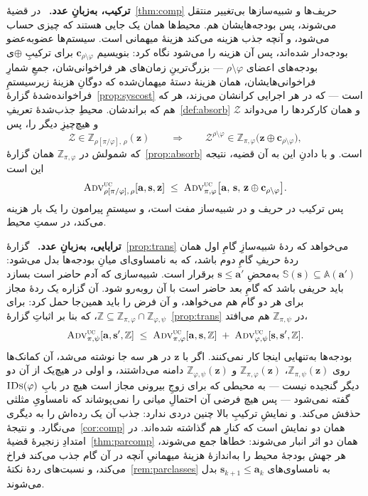 \documentclass[10pt,oneside,openany]{book}
\newcommand{\Zenv}{\mathcal{Z}}
\newcommand{\bd}[1]{\mathbf{#1}}
\newcommand{\advtg}{\op{Adv}}
\newcommand{\Aset}{\mathbb{A}}
\newcommand{\SimSet}{\mathbb{S}}
\newcommand{\ZenvSet}{\mathbb{Z}}
\newcommand{\op}[1]{\textnormal{\textsc{#1}}}
\newcommand{\IDs}{\op{IDs}}
\newcommand{\heading}[1]{\medskip\par\noindent\textcolor{accent}{\textbf{#1.}}\ }
\theoremstyle{accentdef}
\theoremstyle{accentplain}
\begin{document}
\heading{ترکیب، به‌زبانِ عدد} در قضیهٔ~\ref{thm:comp} حریف‌ها و شبیه‌سازها
بی‌تغییر منتقل می‌شوند، پس بودجه‌هایشان هم. محیط‌ها همان یک جایی هستند که
چیزی حساب می‌شود، و آنچه جذب هزینه می‌کند هزینهٔ میهمانی است. سیستم‌ها
عضوبه‌عضو بودجه‌دار شده‌اند، پس آن هزینه را می‌شود نگاه کرد: بنویسیم
$\bd{c}_{\rho \setminus \varphi}$ برای ترکیبِ $\oplus$ی بودجه‌های اعضای
$\rho \setminus \varphi$ --- بزرگ‌ترینِ زمان‌های هر فراخوانی‌شان، جمعِ
شمارِ فراخوانی‌هایشان، همان هزینهٔ دستهٔ میهمان‌شده که دوگانِ هزینهٔ
زیرسیستمِ فراخوانده‌شدهٔ گزارهٔ~\ref{prop:syscost} است --- که در هر اجرایی
کرانشان می‌زند، هر که هم که براندشان. محیطِ جذب‌شدهٔ
تعریفِ~\ref{def:absorb} $\Zenv$ و همان کارکردها را می‌دواند و هیچ‌چیزِ دیگر
را، پس
\[
  \Zenv \in \ZenvSet_{\rho[\pi/\varphi],\,\rho}(\bd{z})
  \qquad\Longrightarrow\qquad
  \Zenv^{\rho \setminus \varphi} \in \ZenvSet_{\pi,\varphi}\bigl(\bd{z} \oplus \bd{c}_{\rho \setminus \varphi}\bigr) ,
\]
که شمولش در $\ZenvSet_{\pi,\varphi}$ همان گزارهٔ~\ref{prop:absorb} است. و
با دادنِ این به آن قضیه، نتیجه این است
\[
  \advtg^{\op{uc}}_{\rho[\pi/\varphi],\,\rho}[\bd{a},\bd{s},\bd{z}]
  \;\leq\;
  \advtg^{\op{uc}}_{\pi,\varphi}\bigl[\bd{a},\,\bd{s},\,\bd{z} \oplus \bd{c}_{\rho \setminus \varphi}\bigr] .
\]
پس ترکیب در حریف و در شبیه‌ساز مفت است، و سیستمِ پیرامون را یک بار هزینه
می‌کند، در سمتِ محیط.

\heading{ترایایی، به‌زبانِ عدد} گزارهٔ~\ref{prop:trans} می‌خواهد که ردهٔ
شبیه‌سازِ گامِ اول همان ردهٔ حریفِ گامِ دوم باشد، که به نامساوی‌ای میانِ
بودجه‌ها بدل می‌شود: $\SimSet(\bd{s}) \subseteq \Aset(\bd{a}')$ به‌محضِ
$\bd{s} \leq \bd{a}'$ برقرار است. شبیه‌سازی که آدم حاضر است بسازد باید
حریفی باشد که گامِ بعد حاضر است با آن روبه‌رو شود. آن گزاره یک ردهٔ مجاز
برای هر دو گام هم می‌خواهد، و آن فرض را باید همین‌جا حمل کرد: برای $\ZenvSet
\subseteq \ZenvSet_{\pi,\varphi} \cap \ZenvSet_{\varphi,\psi}$، که بنا بر
اثباتِ گزارهٔ~\ref{prop:trans} در $\ZenvSet_{\pi,\psi}$ هم می‌افتد،
\[
  \advtg^{\op{uc}}_{\pi,\psi}[\bd{a},\bd{s}',\ZenvSet]
  \;\leq\;
  \advtg^{\op{uc}}_{\pi,\varphi}[\bd{a},\bd{s},\ZenvSet]
  \;+\;
  \advtg^{\op{uc}}_{\varphi,\psi}[\bd{s},\bd{s}',\ZenvSet] .
\]
بودجه‌ها به‌تنهایی اینجا کار نمی‌کنند. اگر با $\bd{z}$ در هر سه جا نوشته
می‌شد، آن کمانک‌ها روی $\ZenvSet_{\pi,\psi}(\bd{z})$،
$\ZenvSet_{\pi,\varphi}(\bd{z})$ و $\ZenvSet_{\varphi,\psi}(\bd{z})$ دامنه
می‌داشتند، و اولی در هیچ‌یک از آن دو دیگر گنجیده نیست --- به محیطی که برای
زوجِ بیرونی مجاز است هیچ در بابِ $\IDs(\varphi)$ گفته نمی‌شود --- پس هیچ
فرضی آن احتمالِ میانی را نمی‌پوشاند که نامساویِ مثلثی حذفش می‌کند. و نمایشِ
ترکیبِ بالا چنین دردی ندارد: جذب آن یک رده‌اش را به دیگری می‌نگارد. و
نتیجهٔ~\ref{cor:comp} همان دو نمایش است که کنارِ هم گذاشته شده‌اند. در
امتدادِ زنجیرهٔ قضیهٔ~\ref{thm:parcomp} همان دو اثر انبار می‌شوند: خطاها جمع
می‌شوند، هر جهش بودجهٔ محیط را به‌اندازهٔ هزینهٔ میهمانیِ آنچه در آن گام جذب
می‌کند فراخ می‌کند، و نسبت‌های ردهٔ نکتهٔ~\ref{rem:parclasses} به
نامساوی‌های $\bd{s}_{k+1} \leq \bd{a}_k$ بدل می‌شوند.
\end{document}
